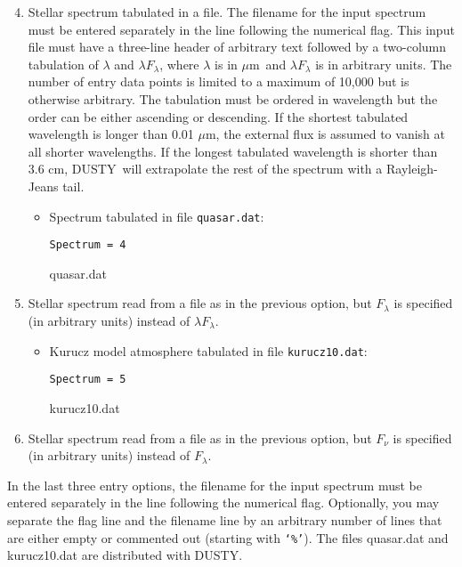 \documentclass[12pt]{article} \usepackage{epsf}
\def\D  {{\sf DUSTY}}
\def\mic    {\hbox{$\mu$m}}
\def\tthdump#1{#1}      %
\begin{document}
\begin{enumerate}
\setcounter{enumi}{3} \tthdump{\item}

Stellar spectrum tabulated in a file. The filename for the input spectrum must
be entered separately in the line following the numerical flag. This input file
must have a three-line header of arbitrary text followed by a two-column
tabulation of $\lambda$ and $\lambda F_\lambda$, where $\lambda$ is in \mic\
and $\lambda F_\lambda$ is in arbitrary units. The number of entry data points
is limited to a maximum of 10,000 but is otherwise arbitrary. The tabulation
must be ordered in wavelength but the order can be either ascending or
descending. If the shortest tabulated wavelength is longer than 0.01 \mic, the
external flux is assumed to vanish at all shorter wavelengths.  If the longest
tabulated wavelength is shorter than 3.6 cm, \D\ will extrapolate the rest of
the spectrum with a Rayleigh-Jeans tail.

\begin{itemize}
\item Spectrum tabulated in file {\tt quasar.dat}:

{\tt Spectrum = 4

quasar.dat}
\end{itemize}

\item  Stellar spectrum read from a file as in the previous option, but
$F_\lambda$ is specified (in arbitrary units) instead of $\lambda F_\lambda$.

\begin{itemize}
\item Kurucz model atmosphere tabulated in file {\tt kurucz10.dat}:

{\tt Spectrum = 5

kurucz10.dat}
\end{itemize}

\item  Stellar spectrum read from a file as in the previous option, but
$F_\nu$ is specified (in arbitrary units) instead of $F_\lambda$.
\end{enumerate}

In the last three entry options, the filename for the input spectrum must be
entered separately in the line following the numerical flag. Optionally, you
may separate the flag line and the filename line by an arbitrary number of
lines that are either empty or commented out (starting with {\tt `\%'}). The
files quasar.dat and kurucz10.dat are distributed with DUSTY.
\end{document}
